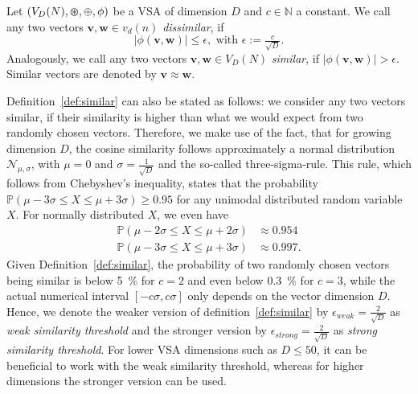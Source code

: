 \begin{defn}
	\label{def:similar}
	Let $(V_{D}(N), \varoast, \oplus, \phi)$ be a \acrfull{VSA} of dimension $D$ and $c \in \mathbb{N}$ a constant. We call any two vectors $ \mathbf{v}, \mathbf{w} \in v_{d}(n)$ \emph{dissimilar}, if
    \begin{equation}
    \label{eq:dissmilar}
	\left| \phi( \mathbf{v}, \mathbf{w}) \right| \leq \epsilon, \textrm{ with } \epsilon:=\tfrac{c}{\sqrt{D}}.
    \end{equation}
	Analogously, we call any two vectors $ \mathbf{v}, \mathbf{w} \in V_{D}(N)$ \emph{similar}, if	$\left| \phi( \mathbf{v}, \mathbf{w}) \right| > \epsilon$.
	Similar vectors are denoted by $ \mathbf{v} \approx \mathbf{w}$. 
\end{defn}
Definition~\ref{def:similar} can also be stated as follows: we consider any two vectors similar, if their similarity is higher than what we would expect from two randomly chosen vectors.
Therefore, we make use of the fact, that for growing dimension $D$, the cosine similarity follows approximately a normal distribution $\mathcal{N}_{\mu, \sigma}$, with $\mu=0$ and $\sigma=\tfrac{1}{\sqrt{D}}$ and the so-called three-sigma-rule.
This rule, which follows from Chebyshev's inequality, states that the probability $\mathbb{P}\left(\mu-3\sigma \leq X \leq \mu+3\sigma \right) \geq 0.95$ for any unimodal distributed random variable $X$.
For normally distributed $X$, we even have
\begin{align*}
	\mathbb{P}\left(\mu-2\sigma \leq X \leq \mu+2\sigma \right) &\approx 0.954 \\
	\mathbb{P}\left(\mu-3\sigma \leq X \leq \mu+3\sigma \right) &\approx 0.997.
\end{align*}
Given Definition~\ref{def:similar}, the probability of two randomly chosen vectors being similar is below \SI{5}{\percent} for $c=2$ and even below \SI{0.3}{\percent} for $c=3$, while the actual numerical interval $\left[-c\sigma, c\sigma\right]$ only depends on the vector dimension $D$.
Hence, we denote the weaker version of definition~\ref{def:similar} by $\epsilon_{weak} = \tfrac{2}{\sqrt{D}}$ as \emph{weak similarity threshold} and the stronger version by $\epsilon_{strong} = \tfrac{2}{\sqrt{D}}$ as \emph{strong similarity threshold}.
For lower \ac{VSA} dimensions such as $D \leq 50$, it can be beneficial to work with the weak similarity threshold, whereas for higher dimensions the stronger version can be used.

